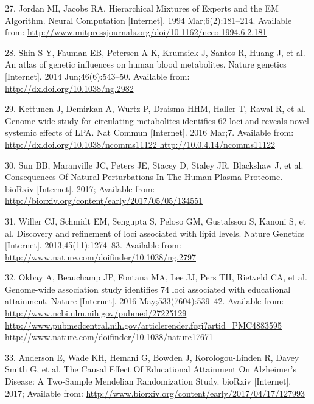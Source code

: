 \documentclass[]{article}
\begin{document}
\hypertarget{ref-Jordan1994}{}
27. Jordan MI, Jacobs RA. Hierarchical Mixtures of Experts and the EM
Algorithm. Neural Computation {[}Internet{]}. 1994 Mar;6(2):181--214.
Available from:
\url{http://www.mitpressjournals.org/doi/10.1162/neco.1994.6.2.181}

\hypertarget{ref-Shin2014}{}
28. Shin S-Y, Fauman EB, Petersen A-K, Krumsiek J, Santos R, Huang J, et
al. An atlas of genetic influences on human blood metabolites. Nature
genetics {[}Internet{]}. 2014 Jun;46(6):543--50. Available from:
\url{http://dx.doi.org/10.1038/ng.2982}

\hypertarget{ref-Kettunen2016}{}
29. Kettunen J, Demirkan A, Wurtz P, Draisma HHM, Haller T, Rawal R, et
al. Genome-wide study for circulating metabolites identifies 62 loci and
reveals novel systemic effects of LPA. Nat Commun {[}Internet{]}. 2016
Mar;7. Available from:
\href{http://dx.doi.org/10.1038/ncomms11122\%20http://10.0.4.14/ncomms11122}{http://dx.doi.org/10.1038/ncomms11122 http://10.0.4.14/ncomms11122}

\hypertarget{ref-Sun2017}{}
30. Sun BB, Maranville JC, Peters JE, Stacey D, Staley JR, Blackshaw J,
et al. Consequences Of Natural Perturbations In The Human Plasma
Proteome. bioRxiv {[}Internet{]}. 2017; Available from:
\url{http://biorxiv.org/content/early/2017/05/05/134551}

\hypertarget{ref-Willer2013}{}
31. Willer CJ, Schmidt EM, Sengupta S, Peloso GM, Gustafsson S, Kanoni
S, et al. Discovery and refinement of loci associated with lipid levels.
Nature Genetics {[}Internet{]}. 2013;45(11):1274--83. Available from:
\url{http://www.nature.com/doifinder/10.1038/ng.2797}

\hypertarget{ref-Okbay2016}{}
32. Okbay A, Beauchamp JP, Fontana MA, Lee JJ, Pers TH, Rietveld CA, et
al. Genome-wide association study identifies 74 loci associated with
educational attainment. Nature {[}Internet{]}. 2016
May;533(7604):539--42. Available from:
\href{http://www.ncbi.nlm.nih.gov/pubmed/27225129\%20http://www.pubmedcentral.nih.gov/articlerender.fcgi?artid=PMC4883595\%20http://www.nature.com/doifinder/10.1038/nature17671}{http://www.ncbi.nlm.nih.gov/pubmed/27225129 http://www.pubmedcentral.nih.gov/articlerender.fcgi?artid=PMC4883595 http://www.nature.com/doifinder/10.1038/nature17671}

\hypertarget{ref-Anderson2017}{}
33. Anderson E, Wade KH, Hemani G, Bowden J, Korologou-Linden R, Davey
Smith G, et al. The Causal Effect Of Educational Attainment On
Alzheimer's Disease: A Two-Sample Mendelian Randomization Study. bioRxiv
{[}Internet{]}. 2017; Available from:
\url{http://www.biorxiv.org/content/early/2017/04/17/127993}
\end{document}
